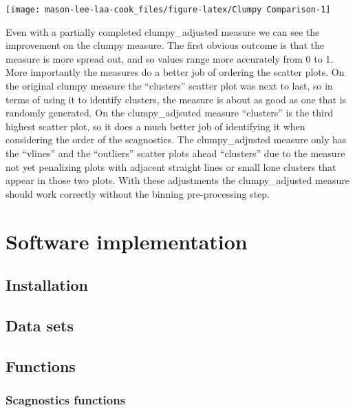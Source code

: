 \begin{Schunk}

\texttt{[image: mason-lee-laa-cook\_files/figure-latex/Clumpy Comparison-1]} \end{Schunk}

Even with a partially completed clumpy\_adjusted measure we can see the
improvement on the clumpy measure. The first obvious outcome is that the
measure is more spread out, and so values range more accurately from 0
to 1. More importantly the measures do a better job of ordering the
scatter plots. On the original clumpy measure the ``clusters'' scatter
plot was next to last, so in terms of using it to identify clusters, the
measure is about as good as one that is randomly generated. On the
clumpy\_adjsuted measure ``clusters'' is the third highest scatter plot,
so it does a much better job of identifying it when considering the
order of the scagnostics. The clumpy\_adjusted measure only has the
``vlines'' and the ``outliers'' scatter plots ahead ``clusters'' due to
the measure not yet penalizing plots with adjacent straight lines or
small lone clusters that appear in those two plots. With these
adjustments the clumpy\_adjusted measure should work correctly without
the binning pre-processing step.

\hypertarget{software-implementation}{%
\section{Software implementation}\label{software-implementation}}

\hypertarget{installation}{%
\subsection{Installation}\label{installation}}

\hypertarget{data-sets}{%
\subsection{Data sets}\label{data-sets}}

\hypertarget{functions}{%
\subsection{Functions}\label{functions}}

\hypertarget{scagnostics-functions}{%
\subsubsection{Scagnostics functions}\label{scagnostics-functions}}

